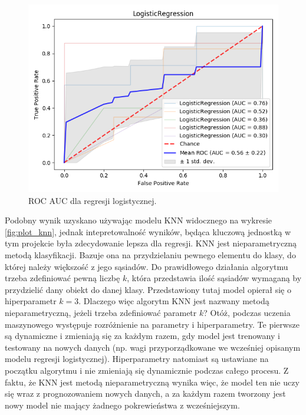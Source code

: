 \documentclass[a4paper,twoside,12pt]{book}
\begin{document}
\begin{description}
\begin{figure}[h!]
    \centering
    \includegraphics[width=\textwidth]{images/logistic_regression.png}
    \caption{ROC AUC dla regresji logistycznej.\protect\footnotemark}
    \label{fig:plot_logit}
\end{figure}
Podobny wynik uzyskano używając modelu KNN widocznego na wykresie \ref{fig:plot_knn}, jednak intepretowalność wyników, będąca kluczową jednostką w tym projekcie była zdecydowanie lepsza dla regresji. KNN jest nieparametryczną metodą klasyfikacji. Bazuje ona na przydzielaniu pewnego elementu do klasy, do której należy większość z jego sąsiadów. Do prawidłowego działania algorytmu trzeba zdefiniować pewną liczbę $ k $, która przedstawia ilość sąsiadów wymaganą by przydzielić dany obiekt do danej klasy. Przedstawiony tutaj model opierał się o hiperparametr $ k = 3$. Dlaczego więc algorytm KNN jest nazwany metodą nieparametryczną, jeżeli trzeba zdefiniować parametr $ k $? Otóż, podczas uczenia maszynowego występuje rozróżnienie na parametry i hiperparametry. Te pierwsze są dynamiczne i zmieniają się za każdym razem, gdy model jest trenowany i testowany na nowych danych (np. wagi przyporządkowane we wcześniej opisanym modelu regresji logistycznej). Hiperparametry natomiast są ustawiane na początku algorytmu i nie zmieniają się dynamicznie podczas całego procesu. Z faktu, że KNN jest metodą nieparametryczną wynika więc, że model ten nie uczy się wraz z prognozowaniem nowych danych, a za każdym razem tworzony jest nowy model nie mający żadnego pokrewieństwa z wcześniejszym.   
\begin{figure}[h!]
    \centering

\end{figure}
\end{description}
\end{document}
